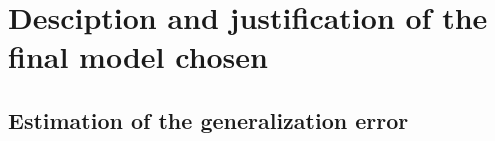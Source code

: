 
\section{Desciption and justification of the final model chosen}

\subsection{Estimation of the generalization error}
